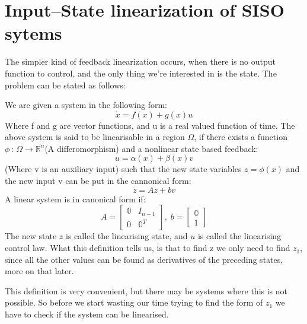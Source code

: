 \section{Input--State linearization of SISO sytems}
The simpler kind of feedback linearization occurs, when there is no output function to control, and the only thing we're interested in is the state. The problem can be stated as follows:
{

    We are given a system in the following form:
    \begin{equation}
        \label{linsys}
        \dot{x} = f(x) + g(x)u
    \end{equation}
    Where f and g are vector functions, and u is a real valued function of time. The above system is said to be linearisable in a region $\Omega$, if there exists a function  $\phi \,:\,\Omega \longrightarrow \mathbb{R}^{n} $(A differomorphism) and a nonlinear state based feedback:
    \begin{equation}
        \label{contlaw}
        u = \alpha(x) + \beta(x)v
    \end{equation}
    (Where v is an auxiliary input) such that the new state variables $z = \phi (x)$ and the new input v can be put in the cannonical form:
    \begin{equation}
        \dot{z} = Az + bv
    \end{equation}
    \nt
    {
        A linear system is in canonical form if:
        \begin{equation}
            A = \begin{bmatrix}
                \mathbb{0} & I_{n-1} \\
                0 & \mathbb{0}^{T}
            \end{bmatrix},\; b = \begin{bmatrix}
                \mathbb{0} \\
                1
            \end{bmatrix}
        \end{equation}
    }
    The new state $z$ is called the linearising state, and  $u$ is called the linearising control law.
    What this definition tells us, is that to find z we only need to find $z_1$, since all the other values can be found as derivatives of the preceding states, more on that later.
}
This definition is very convenient, but there may be systems where this is not possible. So before we start wasting our time trying to find the form of $z_1$ we have to check if the system can be linearised.

